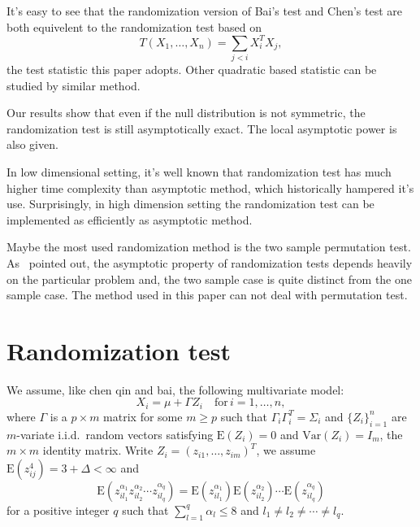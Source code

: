 \documentclass[review]{elsarticle}
\theoremstyle{plain}
\theoremstyle{definition}
\theoremstyle{remark}
\begin{document}
 It's easy to see that the randomization version of Bai's test and Chen's test are both equivelent to the randomization test based on
\begin{equation}\label{Statistic}
    T(X_1,\ldots,X_n)=\sum_{j<i}X_i^T X_j,
\end{equation}
the test statistic this paper adopts.
Other quadratic based statistic can be studied by similar method.

Our results show that even if the null distribution is not symmetric, the randomization test is still asymptotically exact. 
The local asymptotic power is also given.





In low dimensional setting, it's well known that randomization test has much higher time complexity than asymptotic method, which  historically  hampered it's use. 
Surprisingly, in high dimension setting the randomization test can be implemented as efficiently as asymptotic method.



Maybe the most used randomization method is the two sample permutation test.
As~\cite{Romano1990On} pointed out, the asymptotic property of randomization tests depends heavily on the particular problem and, the two sample case is quite distinct from the one sample case.
The method used in this paper can not deal with permutation test.

\section{Randomization test}
We assume, like chen qin and bai, the following multivariate model:
\begin{equation}\label{chenC1}
    X_i=\mu+\Gamma Z_i\quad \textrm{for}\, i=1,\ldots,n,
\end{equation}
where $\Gamma$ is a $p\times m$ matrix for some $m\geq p$ such that $\Gamma_i\Gamma_i^T=\Sigma_i$ and ${\{Z_{i}\}}_{i=1}^n$ are $m$-variate i.i.d.\ random vectors satisfying $\mathrm{E}(Z_i)=0$ and $\mathrm{Var}(Z_i)=I_m$, the $m\times m$ identity matrix. Write $Z_i={(z_{i1},\ldots,z_{im})}^T$, we assume $\mathrm{E}(z_{ij}^4)=3+\Delta<\infty$ and
\begin{equation}\label{chenC2}
    \mathrm{E}(z_{il_1}^{\alpha_1}z_{il_2}^{\alpha_2}\cdots z_{il_q}^{\alpha_q})=\mathrm{E}(z_{il_1}^{\alpha_1})\mathrm{E}(z_{il_2}^{\alpha_2})\cdots \mathrm{E}(z_{il_q}^{\alpha_q})
\end{equation}
for a positive integer $q$ such that $\sum_{l=1}^q \alpha_l\leq 8$ and $l_1\neq l_2\neq \cdots \neq l_q$.
\end{document}
